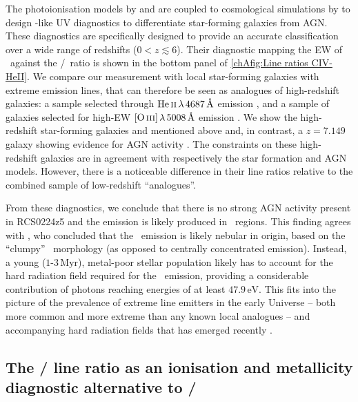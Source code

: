 The photoionisation models by \citet{2016MNRAS.462.1757G} and \citet{2016MNRAS.456.3354F} are coupled to cosmological simulations by \citet{2019MNRAS.487..333H} to design -like UV diagnostics to differentiate star-forming galaxies from AGN. These diagnostics are specifically designed to provide an accurate classification over a wide range of redshifts ($0 < z \lesssim 6$). Their diagnostic mapping the EW of \CIV\ against the \CIV/\HeII\ ratio is shown in the bottom panel of \cref{chAfig:Line ratios CIV-HeII}. We compare our measurement with local star-forming galaxies with extreme emission lines, that can therefore be seen as analogues of high-redshift galaxies: a sample selected through $\HeII \, \lambda \, 4687 \, \Angstrom$ emission \citep[implying a hard ionising spectrum; see][]{2017MNRAS.472.2608S}, and a sample of galaxies selected for high-EW $\OIIIf \, \lambda \, 5008 \, \Angstrom$ emission \citep[among other criteria;][]{2019ApJ...874...93B}. We show the high-redshift star-forming galaxies and mentioned above and, in contrast, a $z = 7.149$ galaxy showing evidence for AGN activity \citep{2017ApJ...851...40L}. The constraints on these high-redshift galaxies are in agreement with respectively the star formation and AGN models. However, there is a noticeable difference in their line ratios relative to the combined sample of low-redshift ``analogues''.

From these diagnostics, we conclude that there is no strong AGN activity present in RCS0224z5 and the emission is likely produced in \HII\ regions. This finding agrees with \citet{2017MNRAS.467.3306S}, who concluded that the \CIV\ emission is likely nebular in origin, based on the ``clumpy'' \CIV\ morphology (as opposed to centrally concentrated emission). Instead, a young ($1$-$3 \, \mathrm{Myr}$), metal-poor stellar population likely has to account for the hard radiation field required for the \CIV\ emission, providing a considerable contribution of photons reaching energies of at least $47.9 \, \mathrm{eV}$. This fits into the picture of the prevalence of extreme line emitters in the early Universe -- both more common and more extreme than any known local analogues -- and accompanying hard radiation fields that has emerged recently \citep[e.g.][]{2014ApJ...784...58S, 2015ApJ...801..122S, 2015MNRAS.454.1393S, 2017ApJ...836L..14M, 2019ApJ...879...70H}.

\subsection{The \texorpdfstring{\NeIII/\OII}{[Ne III]/[O II]} line ratio as an ionisation and metallicity diagnostic alternative to \texorpdfstring{\OIIIf/\OII}{[O III]/[O II]}}
\label{chAssec:Discussion: NeIII/OII}

